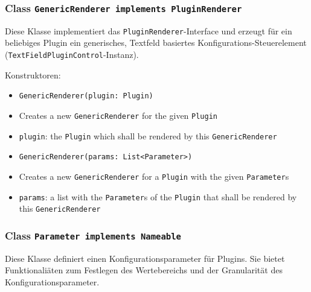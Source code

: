 \documentclass[parskip=full,11pt]{scrartcl}
\begin{document}
\subsubsection{Class \texttt{GenericRenderer implements PluginRenderer}}

Diese Klasse implementiert das \texttt{PluginRenderer}-Interface und erzeugt für ein beliebiges Plugin ein generisches, Textfeld basiertes Konfigurations-Steuerelement (\texttt{TextFieldPluginControl}-Instanz).

Konstruktoren:

\begin{itemize}\itemsep -10pt
	\item \texttt{GenericRenderer(plugin: Plugin)}
	\item[] Creates a new \texttt{GenericRenderer} for the given \texttt{Plugin}
	\item[] \texttt{plugin}: the \texttt{Plugin} which shall be rendered by this \texttt{GenericRenderer}
	
	\item \texttt{GenericRenderer(params: List<Parameter>)}
	\item[] Creates a new \texttt{GenericRenderer} for a \texttt{Plugin} with the given \texttt{Parameter}s
	\item[] \texttt{params}: a list with the \texttt{Parameter}s of the \texttt{Plugin} that shall be rendered by this \texttt{GenericRenderer}
\end{itemize} 

\subsubsection{Class \texttt{Parameter implements Nameable}}

Diese Klasse definiert einen Konfigurationsparameter für Plugins. Sie bietet Funktionaliäten zum Festlegen des Wertebereichs und der Granularität des Konfigurationsparameter.
\end{document}
